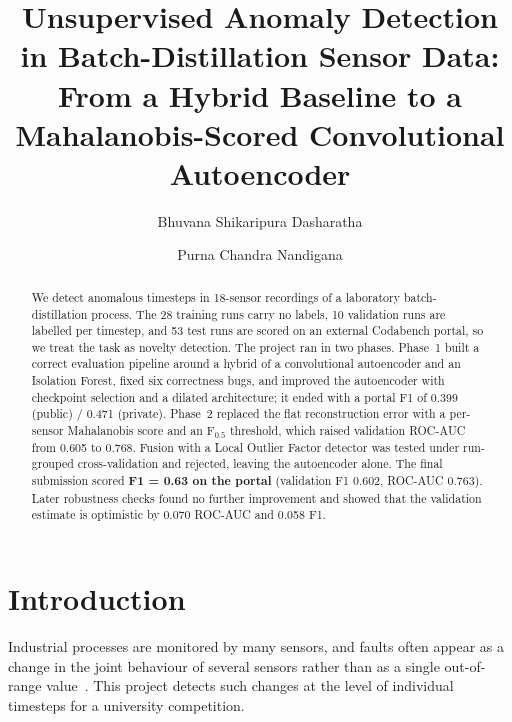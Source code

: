\documentclass[runningheads]{llncs}
\begin{document}
\title{Unsupervised Anomaly Detection in Batch-Distillation Sensor Data: From a Hybrid Baseline to a Mahalanobis-Scored Convolutional Autoencoder}

\author{Bhuvana Shikaripura Dasharatha \and Purna Chandra Nandigana}

\maketitle

\begin{abstract}
We detect anomalous timesteps in 18-sensor recordings of a laboratory batch-distillation process. The 28 training runs carry no labels, 10 validation runs are labelled per timestep, and 53 test runs are scored on an external Codabench portal, so we treat the task as novelty detection. The project ran in two phases. Phase~1 built a correct evaluation pipeline around a hybrid of a convolutional autoencoder and an Isolation Forest, fixed six correctness bugs, and improved the autoencoder with checkpoint selection and a dilated architecture; it ended with a portal F1 of 0.399 (public) / 0.471 (private). Phase~2 replaced the flat reconstruction error with a per-sensor Mahalanobis score and an F$_{0.5}$ threshold, which raised validation ROC-AUC from 0.605 to 0.768. Fusion with a Local Outlier Factor detector was tested under run-grouped cross-validation and rejected, leaving the autoencoder alone. The final submission scored \textbf{F1 = 0.63 on the portal} (validation F1 0.602, ROC-AUC 0.763). Later robustness checks found no further improvement and showed that the validation estimate is optimistic by 0.070 ROC-AUC and 0.058 F1.
\end{abstract}

\section{Introduction}

Industrial processes are monitored by many sensors, and faults often appear as a change in the joint behaviour of several sensors rather than as a single out-of-range value~\cite{malhotra2016lstm,hundman2018detecting,audibert2020usad}. This project detects such changes at the level of individual timesteps for a university competition.
\end{document}
